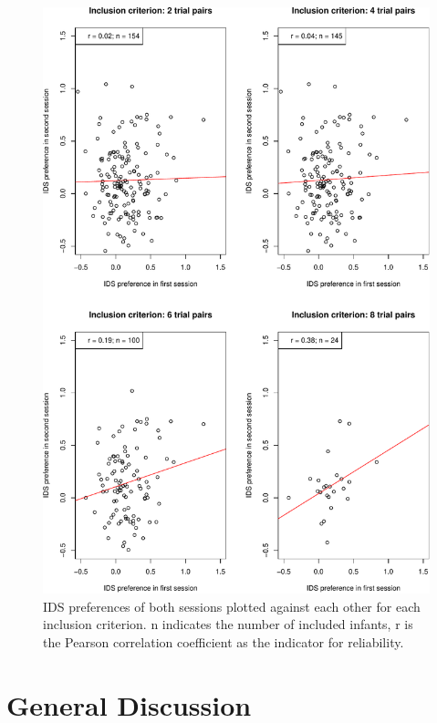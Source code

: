 \documentclass[
  man,floatsintext]{apa6}
\begin{document}
\begin{figure}

{\centering \includegraphics[width=5in]{Retest_current_draft_files/figure-latex/unnamed-chunk-8-1} 

}

\caption{IDS preferences of both sessions plotted against each other for each inclusion criterion. n indicates the number of included infants, r is the Pearson correlation coefficient as the indicator for reliability.}\label{fig:unnamed-chunk-8}
\end{figure}

\hypertarget{general-discussion}{%
\section{General Discussion}\label{general-discussion}}
\end{document}
